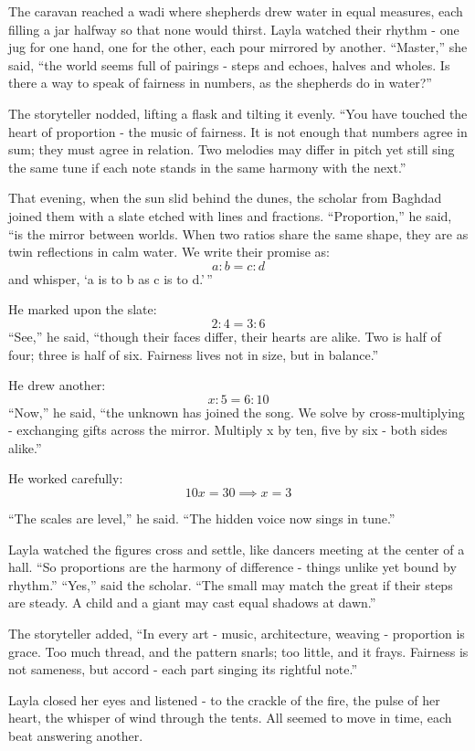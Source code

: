 \documentclass[
  letterpaper,
  DIV=11,
  numbers=noendperiod]{scrreprt}
\begin{document}
The caravan reached a wadi where shepherds drew water in equal measures,
each filling a jar halfway so that none would thirst. Layla watched
their rhythm - one jug for one hand, one for the other, each pour
mirrored by another. ``Master,'' she said, ``the world seems full of
pairings - steps and echoes, halves and wholes. Is there a way to speak
of fairness in numbers, as the shepherds do in water?''

The storyteller nodded, lifting a flask and tilting it evenly. ``You
have touched the heart of proportion - the music of fairness. It is not
enough that numbers agree in sum; they must agree in relation. Two
melodies may differ in pitch yet still sing the same tune if each note
stands in the same harmony with the next.''

That evening, when the sun slid behind the dunes, the scholar from
Baghdad joined them with a slate etched with lines and fractions.
``Proportion,'' he said, ``is the mirror between worlds. When two ratios
share the same shape, they are as twin reflections in calm water. We
write their promise as: \[
a : b = c : d
\] and whisper, `a is to b as c is to d.'\,''

He marked upon the slate: \[
2 : 4 = 3 : 6
\] ``See,'' he said, ``though their faces differ, their hearts are
alike. Two is half of four; three is half of six. Fairness lives not in
size, but in balance.''

He drew another: \[
x : 5 = 6 : 10
\] ``Now,'' he said, ``the unknown has joined the song. We solve by
cross-multiplying - exchanging gifts across the mirror. Multiply x by
ten, five by six - both sides alike.''

He worked carefully: \[
10x = 30 \implies x = 3
\]

``The scales are level,'' he said. ``The hidden voice now sings in
tune.''

Layla watched the figures cross and settle, like dancers meeting at the
center of a hall. ``So proportions are the harmony of difference -
things unlike yet bound by rhythm.'' ``Yes,'' said the scholar. ``The
small may match the great if their steps are steady. A child and a giant
may cast equal shadows at dawn.''

The storyteller added, ``In every art - music, architecture, weaving -
proportion is grace. Too much thread, and the pattern snarls; too
little, and it frays. Fairness is not sameness, but accord - each part
singing its rightful note.''

Layla closed her eyes and listened - to the crackle of the fire, the
pulse of her heart, the whisper of wind through the tents. All seemed to
move in time, each beat answering another.
\end{document}
